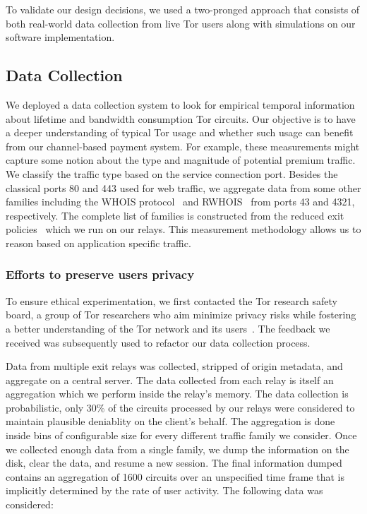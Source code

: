 To validate our design decisions, we used a two-pronged approach that consists
of both real-world data collection from live Tor users along with simulations on
our software implementation.

\subsection{Data Collection}
\label{subsec:datacollection}

We deployed a data collection system to look for empirical temporal information
about lifetime and bandwidth consumption Tor circuits. Our objective is to have
a deeper understanding of typical Tor usage and whether such usage can benefit
from our channel-based payment system. For example, these measurements might
capture some notion about the type and magnitude of potential premium
traffic. We classify the traffic type based on the service connection
port. Besides the classical ports 80 and 443 used for web traffic, we aggregate
data from some other families including the WHOIS protocol~\cite{rfc3912} and
RWHOIS~\cite{rfc2167} from ports 43 and 4321, respectively. The complete list of
families is constructed from the reduced exit
policies~\cite{reducedexitpolicies} which we run on our relays. This measurement
methodology allows us to reason based on application specific traffic.


\subsubsection{Efforts to preserve users privacy}

To ensure ethical experimentation, we first contacted the Tor research safety
board, a group of Tor researchers who aim minimize privacy risks while fostering
a better understanding of the Tor network and its users~\cite{torsafety}. The
feedback we received was subsequently used to refactor our data collection
process.

Data from multiple exit relays was collected, stripped of origin metadata, and
aggregate on a central server. The data collected from each relay is itself an
aggregation which we perform inside the relay's memory. The data collection is
probabilistic, only 30\% of the circuits processed by our relays were considered
to maintain plausible deniablity on the client's behalf. The aggregation is done
inside bins of configurable size for every different traffic family we
consider. Once we collected enough data from a single family, we dump the
information on the disk, clear the data, and resume a new session. The final
information dumped contains an aggregation of 1600 circuits over an unspecified
time frame that is implicitly determined by the rate of user activity. The
following data was considered:

